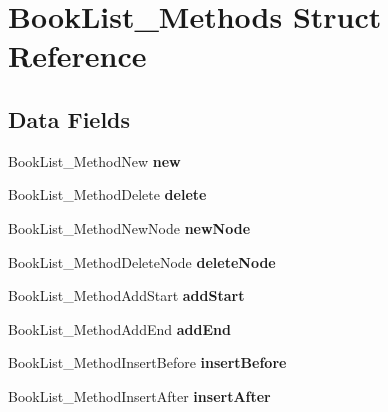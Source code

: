 \hypertarget{structBookList__Methods}{\section{Book\-List\-\_\-\-Methods Struct Reference}
\label{structBookList__Methods}
}
\subsection*{Data Fields}
\begin{DoxyCompactItemize}
\item 
\hypertarget{structBookList__Methods_aa42ebf91c434c2810105fa5c31b0f0b0}{Book\-List\-\_\-\-Method\-New {\bfseries new}}\label{structBookList__Methods_aa42ebf91c434c2810105fa5c31b0f0b0}

\item 
\hypertarget{structBookList__Methods_a1bab1b308fd69f3c237fea3a2afc9a33}{Book\-List\-\_\-\-Method\-Delete {\bfseries delete}}\label{structBookList__Methods_a1bab1b308fd69f3c237fea3a2afc9a33}

\item 
\hypertarget{structBookList__Methods_a5103ca6fff5e13c7ab7f1fade8af5097}{Book\-List\-\_\-\-Method\-New\-Node {\bfseries new\-Node}}\label{structBookList__Methods_a5103ca6fff5e13c7ab7f1fade8af5097}

\item 
\hypertarget{structBookList__Methods_a1f7ded3c6b8db1b26a24cba172fa98a7}{Book\-List\-\_\-\-Method\-Delete\-Node {\bfseries delete\-Node}}\label{structBookList__Methods_a1f7ded3c6b8db1b26a24cba172fa98a7}

\item 
\hypertarget{structBookList__Methods_ad465810cce13ea1ba3bcb7e750665ff5}{Book\-List\-\_\-\-Method\-Add\-Start {\bfseries add\-Start}}\label{structBookList__Methods_ad465810cce13ea1ba3bcb7e750665ff5}

\item 
\hypertarget{structBookList__Methods_af81dc13f390c8681841d41080313f43a}{Book\-List\-\_\-\-Method\-Add\-End {\bfseries add\-End}}\label{structBookList__Methods_af81dc13f390c8681841d41080313f43a}

\item 
\hypertarget{structBookList__Methods_a0db1cbab8285ed9163a2d76be3d7cb50}{Book\-List\-\_\-\-Method\-Insert\-Before {\bfseries insert\-Before}}\label{structBookList__Methods_a0db1cbab8285ed9163a2d76be3d7cb50}

\item 
\hypertarget{structBookList__Methods_ab0d67495d1db40d6d6a53d6de0a7802b}{Book\-List\-\_\-\-Method\-Insert\-After {\bfseries insert\-After}}\label{structBookList__Methods_ab0d67495d1db40d6d6a53d6de0a7802b}


\end{DoxyCompactItemize}
